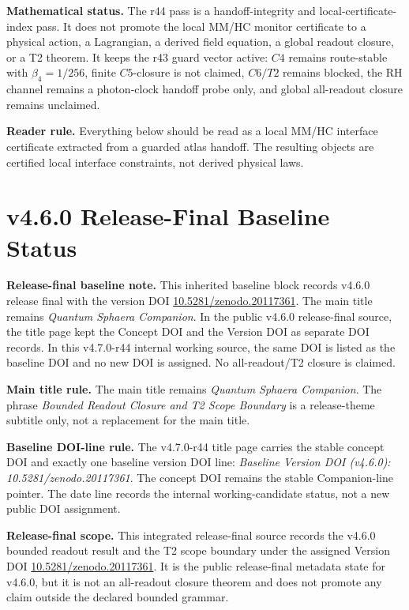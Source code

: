 \noindent\textbf{Mathematical status.} The r44 pass is a handoff-integrity and
local-certificate-index pass. It does not promote the local MM/HC monitor certificate
to a physical action, a Lagrangian, a derived field equation, a global readout
closure, or a T2 theorem. It keeps the r43 guard vector active: \(C4\) remains
route-stable with \(\beta_4=1/256\), finite \(C5\)-closure is not claimed,
\(C6/T2\) remains blocked, the RH channel remains a photon-clock handoff probe
only, and global all-readout closure remains unclaimed.

\noindent\textbf{Reader rule.} Everything below should be read as a local
MM/HC interface certificate extracted from a guarded atlas handoff.  The
resulting objects are certified local interface constraints, not derived
physical laws.
\clearpage
\section*{v4.6.0 Release-Final Baseline Status}
\noindent\textbf{Release-final baseline note.} This inherited baseline block records v4.6.0 release final with the version DOI \href{https://doi.org/10.5281/zenodo.20117361}{10.5281/zenodo.20117361}. The main title remains \emph{Quantum Sphaera Companion}. In the public v4.6.0 release-final source, the title page kept the Concept DOI and the Version DOI as separate DOI records. In this v4.7.0-r44 internal working source, the same DOI is listed as the baseline DOI and no new DOI is assigned. No all-readout/T2 closure is claimed.

\noindent\textbf{Main title rule.} The main title remains \emph{Quantum Sphaera Companion}.  The phrase \emph{Bounded Readout Closure and T2 Scope Boundary} is a release-theme subtitle only, not a replacement for the main title.

\medskip
\noindent\textbf{Baseline DOI-line rule.} The v4.7.0-r44 title page carries the stable concept DOI and exactly one baseline version DOI line: \emph{Baseline Version DOI (v4.6.0): 10.5281/zenodo.20117361}.  The concept DOI remains the stable Companion-line pointer.  The date line records the internal working-candidate status, not a new public DOI assignment.

\medskip
\noindent\textbf{Release-final scope.} This integrated release-final source records the v4.6.0 bounded readout result and the T2 scope boundary under the assigned Version DOI \href{https://doi.org/10.5281/zenodo.20117361}{10.5281/zenodo.20117361}.  It is the public release-final metadata state for v4.6.0, but it is not an all-readout closure theorem and does not promote any claim outside the declared bounded grammar.

